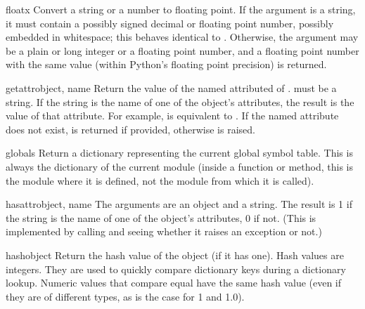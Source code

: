 \begin{funcdesc}{float}{x}
  Convert a string or a number to floating point.  If the argument is a
  string, it must contain a possibly signed decimal or floating point
  number, possibly embedded in whitespace; this behaves identical to
  .  Otherwise, the argument may be a plain
  or long integer or a floating point number, and a floating point
  number with the same value (within Python's floating point
  precision) is returned.

\end{funcdesc}

\begin{funcdesc}{getattr}{object, name}
  Return the value of the named attributed of .  
  must be a string.  If the string is the name of one of the object's
  attributes, the result is the value of that attribute.  For example,
   is equivalent to .  If the
  named attribute does not exist,  is returned if provided,
  otherwise  is raised.
\end{funcdesc}

\begin{funcdesc}{globals}{}
  Return a dictionary representing the current global symbol table.
  This is always the dictionary of the current module (inside a
  function or method, this is the module where it is defined, not the
  module from which it is called).
\end{funcdesc}

\begin{funcdesc}{hasattr}{object, name}
  The arguments are an object and a string.  The result is 1 if the
  string is the name of one of the object's attributes, 0 if not.
  (This is implemented by calling  and seeing whether it raises an exception or not.)
\end{funcdesc}

\begin{funcdesc}{hash}{object}
  Return the hash value of the object (if it has one).  Hash values
  are integers.  They are used to quickly compare dictionary
  keys during a dictionary lookup.  Numeric values that compare equal
  have the same hash value (even if they are of different types, as is
  the case for 1 and 1.0).
\end{funcdesc}

